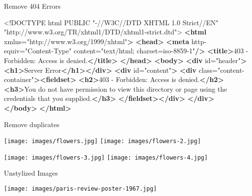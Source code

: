 \documentclass[
  ignorenonframetext,
]{beamer}
\newenvironment{Shaded}{}{}
\newcommand{\DataTypeTok}[1]{\textcolor[rgb]{0.56,0.13,0.00}{#1}}
\newcommand{\KeywordTok}[1]{\textcolor[rgb]{0.00,0.44,0.13}{\textbf{#1}}}
\newcommand{\NormalTok}[1]{#1}
\newcommand{\OtherTok}[1]{\textcolor[rgb]{0.00,0.44,0.13}{#1}}
\newcommand{\StringTok}[1]{\textcolor[rgb]{0.25,0.44,0.63}{#1}}
\begin{document}
\begin{frame}[fragile]{Remove 404 Errors}
\protect\hypertarget{remove-404}{}

\footnotesize
\begin{Shaded}
\begin{Highlighting}[]
\DataTypeTok{<!DOCTYPE }\NormalTok{html PUBLIC "{-}//W3C//DTD XHTML 1.0 Strict//EN"}
\NormalTok{    "http://www.w3.org/TR/xhtml1/DTD/xhtml1{-}strict.dtd"}\DataTypeTok{>}
\KeywordTok{<html}\OtherTok{ xmlns=}\StringTok{"http://www.w3.org/1999/xhtml"}\KeywordTok{>}
\KeywordTok{<head>}
\KeywordTok{<meta}\OtherTok{ http{-}equiv=}\StringTok{"Content{-}Type"}\OtherTok{ content=}\StringTok{"text/html;}
\StringTok{    charset=iso{-}8859{-}1"}\KeywordTok{/>}
\KeywordTok{<title>}\NormalTok{403 {-} Forbidden: Access is denied.}\KeywordTok{</title>}
\KeywordTok{</head>}
\KeywordTok{<body>}
\KeywordTok{<div}\OtherTok{ id=}\StringTok{"header"}\KeywordTok{><h1>}\NormalTok{Server Error}\KeywordTok{</h1></div>}
\KeywordTok{<div}\OtherTok{ id=}\StringTok{"content"}\KeywordTok{>}
 \KeywordTok{<div}\OtherTok{ class=}\StringTok{"content{-}container"}\KeywordTok{><fieldset>}
  \KeywordTok{<h2>}\NormalTok{403 {-} Forbidden: Access is denied.}\KeywordTok{</h2>}
  \KeywordTok{<h3>}\NormalTok{You do not have permission to view this directory or}
\NormalTok{    page using the credentials that you supplied.}\KeywordTok{</h3>}
 \KeywordTok{</fieldset></div>}
\KeywordTok{</div>}
\KeywordTok{</body>}
\KeywordTok{</html>}
\end{Highlighting}
\end{Shaded}

\end{frame}

\begin{frame}{Remove duplicates}
\protect\hypertarget{remove-duplicates}{}

\begin{center}
\texttt{[image: images/flowers.jpg]}
\hspace{8px}
\texttt{[image: images/flowers-2.jpg]}

\texttt{[image: images/flowers-3.jpg]}
\hspace{8px}
\texttt{[image: images/flowers-4.jpg]}
\end{center}

\end{frame}

\begin{frame}{Unstylized Images}
\protect\hypertarget{unstylized-images}{}

\begin{center}
    \texttt{[image: images/paris-review-poster-1967.jpg]}
\end{center}

\end{frame}
\end{document}
